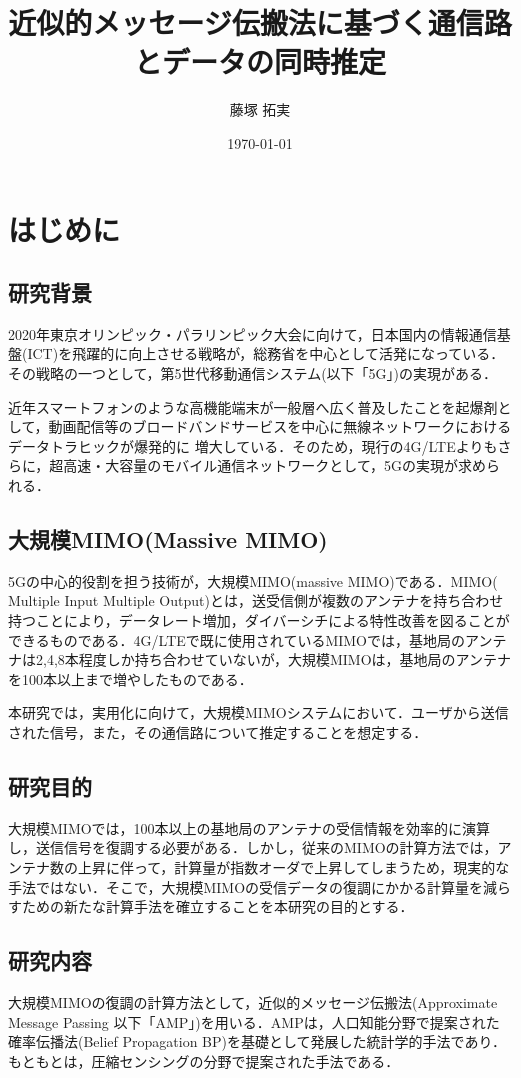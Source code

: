 \documentclass[report]{jsbook}
\title{近似的メッセージ伝搬法に基づく通信路とデータの同時推定}
\author{藤塚 拓実}
\date{\today}
\begin{document}
\maketitle
\tableofcontents
\newpage

\chapter{はじめに}
\section{研究背景}
2020年東京オリンピック・パラリンピック大会に向けて，日本国内の情報通信基盤(ICT)を飛躍的に向上させる戦略が，総務省を中心として活発になっている．その戦略の一つとして，第5世代移動通信システム(以下「5G」)の実現がある．\cite{soumu_suzuki}

近年スマートフォンのような高機能端末が一般層へ広く普及したことを起爆剤として，動画配信等のブロードバンドサービスを中心に無線ネットワークにおけるデータトラヒックが爆発的に
増大している．そのため，現行の4G/LTEよりもさらに，超高速・大容量のモバイル通信ネットワークとして，5Gの実現が求められる\cite{suyama}．

\section{大規模MIMO(Massive MIMO)}
5Gの中心的役割を担う技術が，大規模MIMO(massive MIMO)である．MIMO( Multiple Input Multiple Output)とは，送受信側が複数のアンテナを持ち合わせ持つことにより，データレート増加，ダイバーシチによる特性改善を図ることができるものである\cite{goldsmith}．4G/LTEで既に使用されているMIMOでは，基地局のアンテナは2,4,8本程度しか持ち合わせていないが，大規模MIMOは，基地局のアンテナを100本以上まで増やしたものである．

本研究では，実用化に向けて，大規模MIMOシステムにおいて．ユーザから送信された信号，また，その通信路について推定することを想定する．
\section{研究目的}
大規模MIMOでは，100本以上の基地局のアンテナの受信情報を効率的に演算し，送信信号を復調する必要がある．しかし，従来のMIMOの計算方法では，アンテナ数の上昇に伴って，計算量が指数オーダで上昇してしまうため，現実的な手法ではない．そこで，大規模MIMOの受信データの復調にかかる計算量を減らすための新たな計算手法を確立することを本研究の目的とする．

\section{研究内容}
大規模MIMOの復調の計算方法として，近似的メッセージ伝搬法(Approximate Message Passing 以下「AMP」)を用いる．AMPは，人口知能分野で提案された確率伝播法(Belief Propagation BP)を基礎として発展した統計学的手法であり．もともとは，圧縮センシングの分野で提案された手法である\cite{Donoho}．
\end{document}
